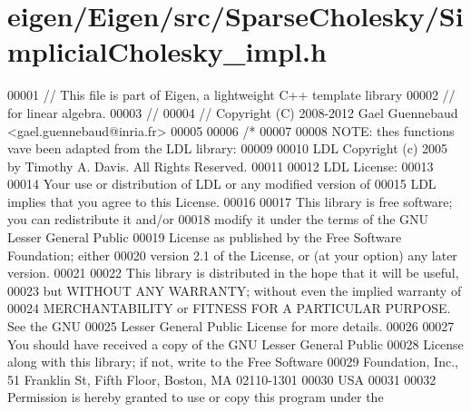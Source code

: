 \hypertarget{eigen_2_eigen_2src_2_sparse_cholesky_2_simplicial_cholesky__impl_8h_source}{}\section{eigen/\+Eigen/src/\+Sparse\+Cholesky/\+Simplicial\+Cholesky\+\_\+impl.h}
\label{eigen_2_eigen_2src_2_sparse_cholesky_2_simplicial_cholesky__impl_8h_source}

\begin{DoxyCode}
00001 \textcolor{comment}{// This file is part of Eigen, a lightweight C++ template library}
00002 \textcolor{comment}{// for linear algebra.}
00003 \textcolor{comment}{//}
00004 \textcolor{comment}{// Copyright (C) 2008-2012 Gael Guennebaud <gael.guennebaud@inria.fr>}
00005 
00006 \textcolor{comment}{/*}
00007 \textcolor{comment}{}
00008 \textcolor{comment}{NOTE: thes functions vave been adapted from the LDL library:}
00009 \textcolor{comment}{}
00010 \textcolor{comment}{LDL Copyright (c) 2005 by Timothy A. Davis.  All Rights Reserved.}
00011 \textcolor{comment}{}
00012 \textcolor{comment}{LDL License:}
00013 \textcolor{comment}{}
00014 \textcolor{comment}{    Your use or distribution of LDL or any modified version of}
00015 \textcolor{comment}{    LDL implies that you agree to this License.}
00016 \textcolor{comment}{}
00017 \textcolor{comment}{    This library is free software; you can redistribute it and/or}
00018 \textcolor{comment}{    modify it under the terms of the GNU Lesser General Public}
00019 \textcolor{comment}{    License as published by the Free Software Foundation; either}
00020 \textcolor{comment}{    version 2.1 of the License, or (at your option) any later version.}
00021 \textcolor{comment}{}
00022 \textcolor{comment}{    This library is distributed in the hope that it will be useful,}
00023 \textcolor{comment}{    but WITHOUT ANY WARRANTY; without even the implied warranty of}
00024 \textcolor{comment}{    MERCHANTABILITY or FITNESS FOR A PARTICULAR PURPOSE.  See the GNU}
00025 \textcolor{comment}{    Lesser General Public License for more details.}
00026 \textcolor{comment}{}
00027 \textcolor{comment}{    You should have received a copy of the GNU Lesser General Public}
00028 \textcolor{comment}{    License along with this library; if not, write to the Free Software}
00029 \textcolor{comment}{    Foundation, Inc., 51 Franklin St, Fifth Floor, Boston, MA  02110-1301}
00030 \textcolor{comment}{    USA}
00031 \textcolor{comment}{}
00032 \textcolor{comment}{    Permission is hereby granted to use or copy this program under the}

\end{DoxyCode}
